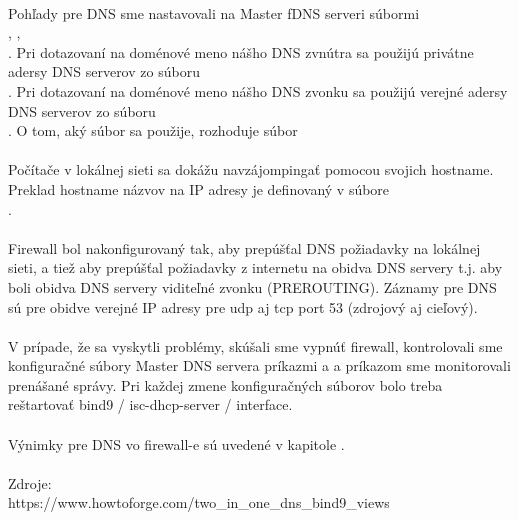 \paragraph{}
Pohľady pre DNS sme nastavovali na Master fDNS serveri súbormi\\ , ,\\ . Pri dotazovaní na doménové meno nášho DNS zvnútra sa použijú privátne adersy DNS serverov zo súboru\\ . Pri dotazovaní na doménové meno nášho DNS zvonku sa použijú verejné adersy DNS serverov zo súboru\\ . O tom, aký súbor sa použije, rozhoduje súbor 
\paragraph{}
Počítače v lokálnej sieti sa dokážu navzájompingať pomocou svojich hostname. Preklad hostname názvov na IP adresy je definovaný v súbore\\ .
\paragraph{}
Firewall bol nakonfigurovaný tak, aby prepúšťal DNS požiadavky na lokálnej sieti, a tiež aby prepúšťal požiadavky z internetu na obidva DNS servery t.j. aby boli obidva DNS servery viditeľné zvonku (PREROUTING). Záznamy pre DNS sú pre obidve verejné IP adresy pre udp aj tcp port 53 (zdrojový aj cieľový).
\paragraph{}
V prípade, že sa vyskytli problémy, skúšali sme vypnúť firewall, kontrolovali sme konfiguračné súbory Master DNS servera príkazmi  a  a príkazom  sme monitorovali prenášané správy. Pri každej zmene konfiguračných súborov bolo treba reštartovať bind9 / isc-dhcp-server / interface.

\paragraph{}
Výnimky pre DNS vo firewall-e sú uvedené v kapitole .
\\
\\
\noindent
Zdroje:\\
\noindent
https://www.howtoforge.com/two\_in\_one\_dns\_bind9\_views\\

